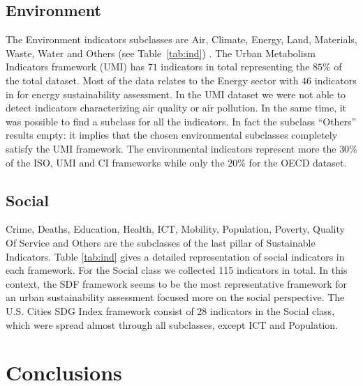 \documentclass[preprint,12pt]{elsarticle}
\begin{document}
\subsection{Environment}
The Environment indicators subclasses are Air, Climate, Energy, Land, Materials, Waste, Water and Others (see Table~\ref{tab:ind}) . The Urban Metabolism Indicators framework (UMI) has $71$ indicators in total representing the $85\%$ of the total dataset. Most of the data relates to the Energy sector with $46$ indicators in for energy sustainability assessment. In the UMI dataset we were not able to detect indicators characterizing air quality or air pollution. In the same time, it was possible to find a subclass for all the indicators. In fact the subclass ``Others'' results empty: it implies that the chosen environmental subclasses completely satisfy the UMI framework. The environmental indicators represent more the $30\%$ of the ISO, UMI and CI frameworks while only the $20
\%$ for the OECD dataset. 


\subsection{Social}
Crime, Deaths, Education, Health, ICT, Mobility, Population, Poverty, Quality Of Service and Others are the subclasses of the last pillar of Sustainable Indicators.
Table \ref{tab:ind} gives a detailed representation of social indicators in each framework. For the Social class we collected 115 indicators in total. In this context, the SDF framework seems to be the most representative framework for an urban sustainability assessment focused more on the social perspective. 
The U.S. Cities SDG Index framework consist of 28 indicators in the Social class, which were spread almost through all subclasses, except ICT and Population.




\section{Conclusions}

% 
 
\end{document}
